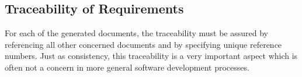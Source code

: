 \subsection{Traceability of Requirements}
\label{sec:trac-requ}

For each of the generated documents, the traceability must be assured by
referencing all other concerned documents and by specifying unique reference
numbers. Just as consistency, this traceability is a very important aspect which
is often not a concern in more general software development processes.




